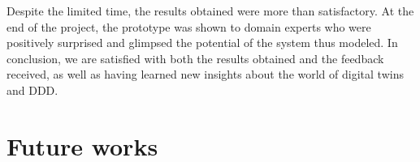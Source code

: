 Despite the limited time, the results obtained were more than satisfactory. At the end of the project, the prototype was shown to domain experts who were positively surprised and glimpsed the potential of the system thus modeled. In conclusion, we are satisfied with both the results obtained and the feedback received, as well as having learned new insights about the world of digital twins and DDD.

\section{Future works}
